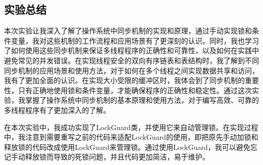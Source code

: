 \documentclass[a4paper,twoside]{article}
\begin{document}
\begin{spacing}{1.2}




\section{实验总结}


本次实验让我深入了解了操作系统中同步机制的实现和原理，通过手动实现锁和条件变量，我对这些机制的工作流程和应用场景有了更深刻的认识。同时，我也学习了如何使用这些同步机制来保证多线程程序的正确性和可靠性，以及如何在实践中避免常见的并发错误。在实现线程安全的双向有序链表和表结构时，我了解到不同同步机制的应用场景和使用方法，对于如何在多个线程之间实现数据共享和访问，我有了更加全面的认识。在实现大小受限的缓冲区时，我体会到了同步机制的重要性，只有正确地使用锁和条件变量，才能确保程序的正确性和稳定性。通过这次实验，我掌握了操作系统中同步机制的基本原理和使用方法，对于编写高效、可靠的多线程程序有了更加深入的了解。

在本次实验中，我成功实现了LockGuard类，并使用它来自动管理锁。在实现过程中，我注意到需要重写之前的代码来适配LockGuard的使用，即把原先手动加锁和释放锁的代码改成使用LockGuard来管理锁。通过使用LockGuard，我可以避免忘记手动释放锁而导致的死锁问题，并且代码更加简洁，易于维护。

\end{spacing}
\end{document}
